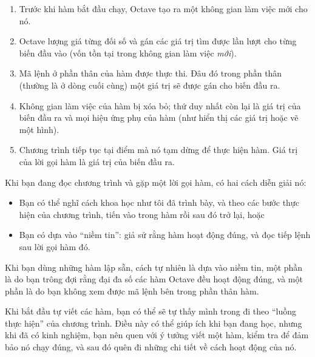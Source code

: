 \documentclass[12pt]{book}
\begin{document}
\begin{enumerate}

\item Trước khi hàm bắt đầu chạy, Octave tạo ra một không gian
làm việc mới cho nó.

\item Octave lượng giá từng đối số và gán các giá trị tìm được
lần lượt cho từng biến đầu vào (vốn tồn tại trong không gian
làm việc {\em mới}).

\item Mã lệnh ở phần thân của hàm được thực thi. Đâu đó trong 
phần thân (thường là ở dòng cuối cùng) một giá trị sẽ được gán
cho biến đầu ra.

\item Không gian làm việc của hàm bị xóa bỏ; thứ duy nhất 
còn lại là giá trị của biến đầu ra và mọi hiệu ứng phụ của hàm
(như hiển thị các giá trị hoặc vẽ một hình).

\item Chương trình tiếp tục tại điểm mà nó tạm dừng để thực
hiện hàm. Giá trị của lời gọi hàm là giá trị của biến đầu ra.

\end{enumerate}

Khi bạn đang đọc chương trình và gặp một lời gọi hàm, có hai cách
diễn giải nó:

\begin{itemize}

\item Bạn có thể nghĩ cách khoa học như tôi đã trình bày, và theo
các bước thực hiện của chương trình, tiến vào trong hàm rồi sau đó
trở lại, hoặc

\item Bạn có dựa vào ``niềm tin'': giả sử rằng hàm hoạt động đúng,
và đọc tiếp lệnh sau lời gọi hàm đó.

\end{itemize}

Khi bạn dùng những hàm lập sẵn, cách tự nhiên là dựa vào niềm tin,
một phần là do bạn trông đợi rằng đại đa số các hàm Octave đều hoạt
động đúng, và một phần là do bạn không xem được mã lệnh bên trong
phần thân hàm.

Khi bắt đầu tự viết các hàm, bạn có thể sẽ tự thấy mình trong 
đi theo ``luồng thực hiện'' của chương trình. Điều này có thể 
giúp ích khi bạn đang học, nhưng khi đã có kinh nghiệm, bạn nên
quen với ý tưởng viết một hàm, kiểm tra để đảm bảo nó chạy đúng,
và sau đó quên đi những chi tiết về cách hoạt động của nó.
\end{document}
